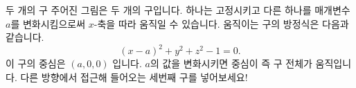 \begin{surferPage}{두 개의 구}
주어진 그림은 두 개의 구입니다. 하나는 고정시키고 다른 하나를 매개변수 $a$를 변화시킴으로써 $x$-축을 따라 움직일 수 있습니다.
움직이는 구의 방정식은 다음과 같습니다.
\[(x-a)^2+y^2+z^2-1=0.\]
이 구의 중심은 $(a,0,0)$ 입니다.  $a$의 값을 변화시키면 중심이 즉 구 전체가 움직입니다. 다른 방향에서 접근해 들어오는 세번째 구를 넣어보세요!
\end{surferPage}
